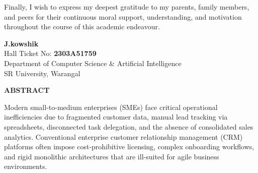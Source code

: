 \vspace{0.4cm}
\noindent Finally, I wish to express my deepest gratitude to my parents, family members, and peers for their continuous moral support, understanding, and motivation throughout the course of this academic endeavour.

\vspace{2cm}
\noindent
\begin{flushright}
    \textbf{J.kowshik}\\
    Hall Ticket No: \textbf{2303A51759}\\
    Department of Computer Science \& Artificial Intelligence\\
    SR University, Warangal
\end{flushright}

\newpage
\thispagestyle{plain}
\begin{center}
    {\fontsize{16}{20}\selectfont \textbf{ABSTRACT}}\\[0.6cm]
\end{center}

\noindent Modern small-to-medium enterprises (SMEs) face critical operational inefficiencies due to fragmented customer data, manual lead tracking via spreadsheets, disconnected task delegation, and the absence of consolidated sales analytics. Conventional enterprise customer relationship management (CRM) platforms often impose cost-prohibitive licensing, complex onboarding workflows, and rigid monolithic architectures that are ill-suited for agile business environments. 

